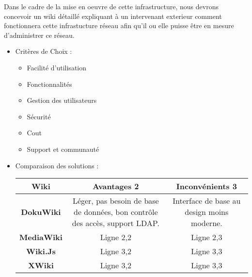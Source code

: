 \documentclass[../Livrable1.tex]{subfiles}
\begin{document}
Dans le cadre de la mise en oeuvre de cette infrastructure, nous devrons concevoir un wiki détaillé expliquant à un
intervenant exterieur comment fonctionnera cette infrastucture réseau afin qu'il ou elle puisse être en mesure d'administrer ce réseau.

\begin{itemize}
    \item Critères de Choix :
    \begin{itemize}
    	\item Facilité d'utilisation
    	\item Fonctionnalités
    	\item Gestion des utilisateurs
    	\item Sécurité
    	\item Cout
    	\item Support et communauté
    \end{itemize}
    \item Comparaison des solutions :
    	
    	\vspace{5pt}
    	\begin{tabular}{|c|c|c|}
    		\hline
    		Wiki & Avantages 2 & Inconvénients 3 \\ 
    		\hline
    		\textbf{DokuWiki} & Léger, pas besoin de base de données, bon contrôle des accès, support LDAP. & Interface de base au design moins moderne. \\
    		\hline
    		\textbf{MediaWiki} & Ligne 2,2 & Ligne 2,3 \\
    		\hline
    		\textbf{Wiki.Js} & Ligne 3,2 & Ligne 3,3 \\
    		\hline
    		\textbf{XWiki} & Ligne 3,2 & Ligne 3,3 \\
    		\hline
    \end{tabular}
\end{itemize}
\end{document}
